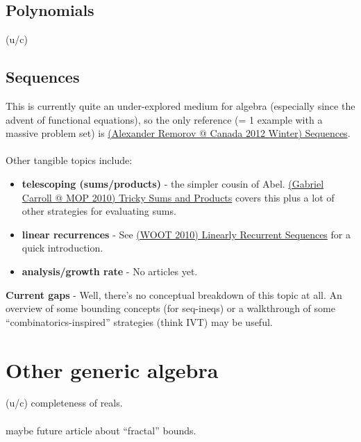 	\subsection{Polynomials}
	(u/c)
	\subsection{Sequences}
	This is currently quite an under-explored medium for algebra (especially since the advent of functional equations), so the only reference (= 1 example with a massive problem set) is \href{run:./F_Algebra/(Alexander Remorov @ Canada 2012 Winter) Sequences.pdf}{(Alexander Remorov @ Canada 2012 Winter) Sequences}.\\\\
	Other tangible topics include:
	\begin{itemize}
	\item \textbf{telescoping (sums/products)} - the simpler cousin of Abel. \href{run:./F_Algebra/(Gabriel Carroll @ MOP 2010) Tricky Sums and Products.pdf}{(Gabriel Carroll @ MOP 2010) Tricky Sums and Products} covers this plus a lot of other strategies for evaluating sums.
	\item \textbf{linear recurrences} - See \href{run:./F_Algebra/(WOOT 2010) Linearly Recurrent Sequences.pdf}{(WOOT 2010) Linearly Recurrent Sequences} for a quick introduction.
	\item \textbf{analysis/growth rate} - No articles yet.
	\end{itemize}
	\textbf{Current gaps} - Well, there's no conceptual breakdown of this topic at all. An overview of some bounding concepts (for seq-ineqs) or a walkthrough of some ``combinatorics-inspired'' strategies (think IVT) may be useful.
	\section{Other generic algebra}
	(u/c) completeness of reals.\\\\
	maybe future article about ``fractal'' bounds.
%